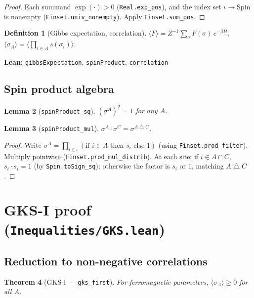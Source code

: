 \documentclass[a4paper,11pt]{article}
\newtheorem{theorem}{Theorem}
\newtheorem{lemma}[theorem]{Lemma}
\newtheorem{definition}[theorem]{Definition}
\begin{document}
\begin{proof}
Each summand $\exp(\cdot) > 0$ (\texttt{Real.exp\_pos}), and the
index set $\iota \to \mathrm{Spin}$ is nonempty
(\texttt{Finset.univ\_nonempty}).
Apply \texttt{Finset.sum\_pos}.
\end{proof}

\begin{definition}[Gibbs expectation, correlation]
$\langle F \rangle = Z^{-1} \sum_\sigma F(\sigma)\,e^{-\beta H}$, \quad
$\langle \sigma_A \rangle = \langle \prod_{i \in A} s(\sigma_i) \rangle$.
\end{definition}

\noindent\textbf{Lean:} \texttt{gibbsExpectation},
\texttt{spinProduct}, \texttt{correlation}

\subsection{Spin product algebra}

\begin{lemma}[\texttt{spinProduct\_sq}]
$(\sigma^A)^2 = 1$ for any $A$.
\end{lemma}

\begin{lemma}[\texttt{spinProduct\_mul}]
$\sigma^A \cdot \sigma^C = \sigma^{A \bigtriangleup C}$.
\end{lemma}

\begin{proof}
Write $\sigma^A = \prod_{i \in \iota}
(\text{if } i \in A \text{ then } s_i \text{ else } 1)$
(using \texttt{Finset.prod\_filter}).
Multiply pointwise (\texttt{Finset.prod\_mul\_distrib}).
At each site: if $i \in A \cap C$, $s_i \cdot s_i = 1$ (by
\texttt{Spin.toSign\_sq}); otherwise the factor is $s_i$ or $1$,
matching $A \bigtriangleup C$.
\end{proof}

\section{GKS-I proof (\texttt{Inequalities/GKS.lean})}

\subsection{Reduction to non-negative correlations}

\begin{theorem}[GKS-I --- \texttt{gks\_first}]
For ferromagnetic parameters, $\langle \sigma_A \rangle \geq 0$
for all $A$.
\end{theorem}
\end{document}
